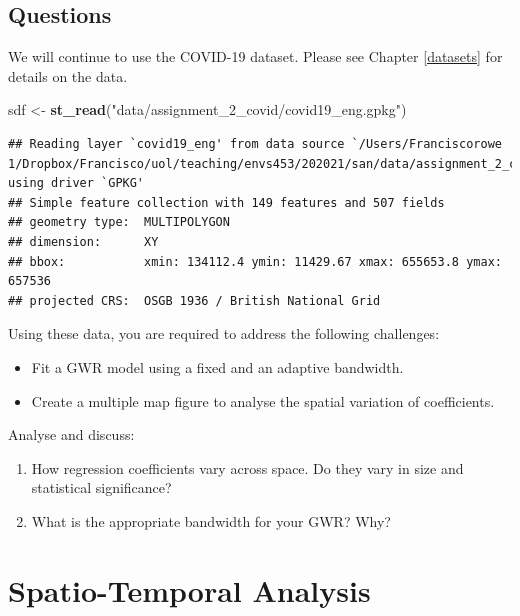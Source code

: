 \documentclass[
]{book}
\newenvironment{Shaded}{\begin{snugshade}}{\end{snugshade}}
\newcommand{\KeywordTok}[1]{\textcolor[rgb]{0.13,0.29,0.53}{\textbf{#1}}}
\newcommand{\NormalTok}[1]{#1}
\newcommand{\StringTok}[1]{\textcolor[rgb]{0.31,0.60,0.02}{#1}}
\providecommand{\tightlist}{%
  \setlength{\itemsep}{0pt}\setlength{\parskip}{0pt}}
\begin{document}
\hypertarget{questions-5}{%
\section{Questions}\label{questions-5}}

We will continue to use the COVID-19 dataset. Please see Chapter \ref{datasets} for details on the data.

\begin{Shaded}
\begin{Highlighting}[]
\NormalTok{sdf <-}\StringTok{ }\KeywordTok{st_read}\NormalTok{(}\StringTok{"data/assignment_2_covid/covid19_eng.gpkg"}\NormalTok{)}
\end{Highlighting}
\end{Shaded}

\begin{verbatim}
## Reading layer `covid19_eng' from data source `/Users/Franciscorowe 1/Dropbox/Francisco/uol/teaching/envs453/202021/san/data/assignment_2_covid/covid19_eng.gpkg' using driver `GPKG'
## Simple feature collection with 149 features and 507 fields
## geometry type:  MULTIPOLYGON
## dimension:      XY
## bbox:           xmin: 134112.4 ymin: 11429.67 xmax: 655653.8 ymax: 657536
## projected CRS:  OSGB 1936 / British National Grid
\end{verbatim}

Using these data, you are required to address the following challenges:

\begin{itemize}
\item
  Fit a GWR model using a fixed and an adaptive bandwidth.
\item
  Create a multiple map figure to analyse the spatial variation of coefficients.
\end{itemize}

Analyse and discuss:

\begin{enumerate}
\def\labelenumi{\arabic{enumi}.}
\tightlist
\item
  How regression coefficients vary across space. Do they vary in size and statistical significance?
\item
  What is the appropriate bandwidth for your GWR? Why?
\end{enumerate}

\hypertarget{sta}{%
\chapter{Spatio-Temporal Analysis}\label{sta}}
\end{document}

